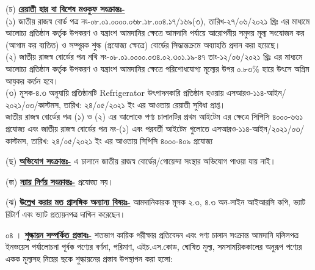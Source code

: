 \documentclass[11pt]{article}
\begin{document}
\begin{description}
\item \hspace{1em} (চ)
\underline{\textbf{রেয়াতী হার বা বিশেষ মওকুফ সংক্রান্তঃ-}}
\\
(১) জাতীয় রাজস্ব বোর্ড পত্র নং-০৮.০১.০০০০.০৬৮.১৮.০০৪.১৭/১৬৯(৩),
তারিখ-২৭/০৬/২০২১ খ্রিঃ এর মাধ্যমে আলোচ্য প্রতিষ্ঠান কর্তৃক উপকরণ ও যন্ত্রাংশ
আমদানির ক্ষেত্রে আমদানি পর্যায়ে আরোপনীয় সমুদয় মূল্য সংযোজন কর (আগাম কর ব্যতিত)
ও সম্পূরক শুল্ক (প্রযোজ্য ক্ষেত্রে) বোর্ডের সিদ্ধান্তক্রমে অব্যাহতি প্রদান করা হয়েছে।
\\
(২) জাতীয় রাজস্ব বোর্ডের পত্র নথি নং-০৮.০১.০০০০.০৩৪.০২.৩০১.১৯-৪৭
তাং-১২/০৬/২০২১ খ্রিঃ এর মাধ্যমে আলোচ্য প্রতিষ্ঠান কর্তৃক উপকরণ ও যন্ত্রাংশ
আমদানির ক্ষেত্রে পরিশোধযোগ্য মূল্যের উপর ০.৮৩\% হারে উৎসে অগ্রিম আয়কর
কর্তন হবে।
\\
(৩) মূসক-৪.৩ অনুযায়ি প্রতিষ্ঠানটি Refrigerator উৎপাদনকারি প্রতিষ্ঠান হওয়ায়
এসআরও-১১৪-আইন/২০২১/০৩/কাস্টমস, তারিখ: ২৪/০৫/২০২১ ইং এর
আওতায় রেয়াতী সুবিধা প্রাপ্ত।
\\
জাতীয় রাজস্ব বোর্ডের পত্র (১) ও (২) এর আলোকে পণ্য চালানটির প্রথম আইটেম
এর ক্ষেত্রে সিপিসি ৪০০০-৬৬১ প্রযোজ্য এবং জাতীয় রাজস্ব বোর্ডের পত্র নং-(১)
এবং পরবর্তী আইটেম গুলোতে এসআরও-১১৪-আইন/২০২১/০৩/কাস্টমস,
তারিখ: ২৪/০৫/২০২১ ইং এর আওতায় সিপিসি ৪০০০-৪০৯ প্রযোজ্য
\item \hspace{1em} (ছ)
\underline{\textbf{অভিযোগ সংক্রান্তঃ-}} এ চালানে জাতীয় রাজস্ব বোর্ডের/গোয়েন্দা
সংস্থার অভিযোগ পাওয়া যায় নাই।
\item \hspace{1em} (জ)
\underline{\textbf{ন্যায় নির্ণয় সংক্রান্তঃ-}} প্রযোজ্য নয়।
\item \hspace{1em} (ঝ)
\underline{\textbf{উল্লেখ করার মত প্রাসঙ্গিক অন্যান্য বিষয়ঃ-}} আমদানিকারক
মূসক ২.৩, ৪.৩ অন-লাইন আইআরসি কপি, ভ্যাট রিটার্ণ এবং ভ্যাট প্রত্যয়নপত্র দাখিল
করেছেন।
\end{description}
০৪ । \underline{\textbf{শুল্কায়ন সম্পর্কিত প্রস্তাবঃ-}}
শতভাগ কায়িক পরীক্ষার প্রতিবেদন এবং পণ্য চালান সংক্রান্ত আমদানি দলিলপত্র
ইনভয়েস পর্যালোচনা পূর্বক পণ্যের বর্ণনা, পরিমাণ, এইচ.এস.কোড, ঘোষিত মূল্য,
সমসাময়িককালের অনুরূপ পণ্যের একক মূল্যসহ নিম্নের ছকে শুল্কায়নের প্রস্তাব উপস্থাপন
করা হলো:
\\
\noindent
\end{document}
